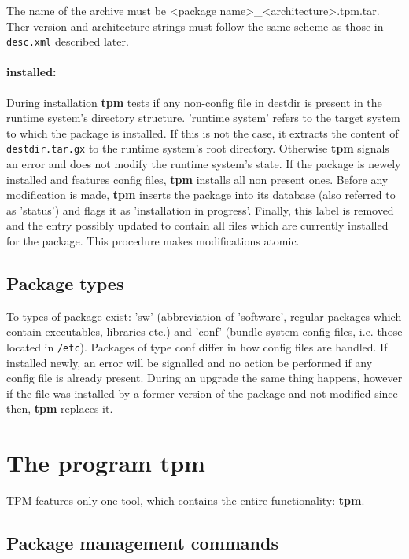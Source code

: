 \documentclass[a4paper]{article}
\newcommand{\file}[1]{\texttt{#1}}
\newcommand{\program}[1]{\textbf{#1}}
\begin{document}
	\noindent
	The name of the archive must be <package name>\_<architecture>.tpm.tar. Ther version and architecture strings must follow the same scheme as those in \file{desc.xml} described later.
	
	\paragraph{installed:}
	During installation \program{tpm} tests if any non-config file in destdir is present in the runtime system's directory structure. 'runtime system' refers to the target system to which the package is installed. If this is not the case, it extracts the content of \file{destdir.tar.gx} to the runtime system's root directory. Otherwise \program{tpm} signals an error and does not modify the runtime system's state. If the package is newely installed and features config files, \program{tpm} installs all non present ones. Before any modification is made, \program{tpm} inserts the package into its database (also referred to as 'status') and flags it as 'installation in progress'. Finally, this label is removed and the entry possibly updated to contain all files which are currently installed for the package. This procedure makes modifications atomic.
	
	\subsection{Package types}
	\label{sec:package_types}
	
	To types of package exist: 'sw' (abbreviation of 'software', regular packages which contain executables, libraries etc.) and 'conf' (bundle system config files, i.e. those located in \file{/etc}). Packages of type conf differ in how config files are handled. If installed newly, an error will be signalled and no action be performed if any config file is already present. During an upgrade the same thing happens, however if the file was installed by a former version of the package and not modified since then, \program{tpm} replaces it.
	
	\section{The program \program{tpm}}
	\label{sec:the_program_tpm}
	
	TPM features only one tool, which contains the entire functionality: \program{tpm}.
	
	\subsection{Package management commands}
	\label{sec:package_management_commands}
	
\end{document}
